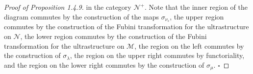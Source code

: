 \documentclass[11pt]{article}
\theoremstyle{plain}
\begin{document}
\begin{proof}[Proof of Proposition 1.4.9]
in the category $\mathcal{N}^+$. Note that the inner region of the diagram commutes by the construction of the
maps $\sigma_{\nu_s}$, the upper region commutes by the construction of the Fubini transformation for the
ultrastructure on $\mathcal{N}$, the lower region commutes by the construction of the Fubini transformation
for the ultrastructure on $\mathcal{M}$, the region on the left commutes by the construction of
$\sigma_\lambda$, the region on the upper right commutes by functoriality, and the region on the lower right
commutes by the construction of $\sigma_\mu$. \hfill$\square$
\end{proof}
\end{document}

